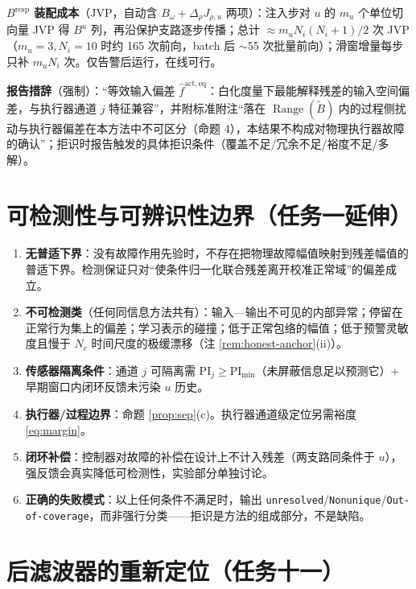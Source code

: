 \documentclass[11pt,a4paper]{ctexart}
\theoremstyle{remark}
\newcommand{\Range}{\operatorname{Range}}
\begin{document}
\textbf{$B^{\mathrm{resp}}$ 装配成本}（JVP，自动含 $B_\omega+\Delta_\rho J_{\rho,u}$ 两项）：注入步对 $u$ 的 $m_u$ 个单位切向量 JVP 得 $B^u$ 列，再沿保护支路逐步传播；总计 $\approx m_uN_i(N_i{+}1)/2$ 次 JVP（$m_u{=}3,N_i{=}10$ 时约 165 次前向，batch 后 $\sim$55 次批量前向）；滑窗增量每步只补 $m_uN_i$ 次。仅告警后运行，在线可行。

\textbf{报告措辞}（强制）：“等效输入偏差 $\hat f^{\mathrm{act,eq}}$：白化度量下最能解释残差的输入空间偏差，与执行器通道 $j$ 特征兼容”，并附标准附注“落在 $\Range(\tilde B)$ 内的过程侧扰动与执行器偏差在本方法中不可区分（命题 4），本结果不构成对物理执行器故障的确认”；拒识时报告触发的具体拒识条件（覆盖不足/冗余不足/裕度不足/多解）。

\section{可检测性与可辨识性边界（任务一延伸）}

\begin{enumerate}
\item \textbf{无普适下界}：没有故障作用先验时，不存在把物理故障幅值映射到残差幅值的普适下界。检测保证只对“使条件归一化联合残差离开校准正常域”的偏差成立。
\item \textbf{不可检测类}（任何同信息方法共有）：输入—输出不可见的内部异常；停留在正常行为集上的偏差；学习表示的碰撞；低于正常包络的幅值；低于预警灵敏度且慢于 $N_c$ 时间尺度的极缓漂移（注 \ref{rem:honest-anchor}(ii)）。
\item \textbf{传感器隔离条件}：通道 $j$ 可隔离需 $\mathrm{PI}_j\ge\mathrm{PI}_{\min}$（未屏蔽信息足以预测它）+ 早期窗口内闭环反馈未污染 $u$ 历史。
\item \textbf{执行器/过程边界}：命题 \ref{prop:sep}(c)。执行器通道级定位另需裕度 \eqref{eq:margin}。
\item \textbf{闭环补偿}：控制器对故障的补偿在设计上不计入残差（两支路同条件于 $u$），强反馈会真实降低可检测性，实验部分单独讨论。
\item \textbf{正确的失败模式}：以上任何条件不满足时，输出 \texttt{unresolved}/\texttt{Nonunique}/\texttt{Out-of-coverage}，而非强行分类——拒识是方法的组成部分，不是缺陷。
\end{enumerate}

\section{后滤波器的重新定位（任务十一）}
\end{document}
